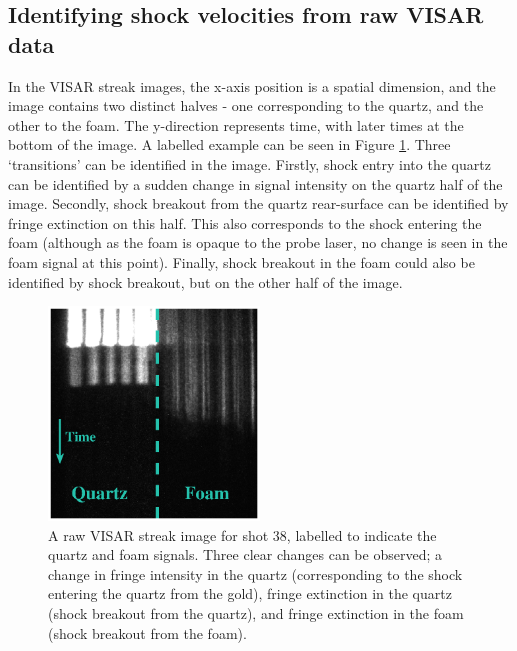\subsection{Identifying shock velocities from raw VISAR data}

In the VISAR streak images, the x-axis position is a spatial dimension, and the image contains two distinct halves - one corresponding to the quartz, and the other to the foam. The y-direction represents time, with later times at the bottom of the image. A labelled example can be seen in Figure \ref{fig:VISARImage}. Three `transitions' can be identified in the image. Firstly, shock entry into the quartz can be identified by a sudden change in signal intensity on the quartz half of the image. Secondly, shock breakout from the quartz rear-surface can be identified by fringe extinction on this half. This also corresponds to the shock entering the foam (although as the foam is opaque to the probe laser, no change is seen in the foam signal at this point). Finally, shock breakout in the foam could also be identified by shock breakout, but on the other half of the image.

\begin{figure} [h]
\begin{centering}
\includegraphics[width=0.5\textwidth]{figures/Experiment/VISARImage.eps}%
\caption{\label{fig:VISARImage} A raw VISAR streak image for shot 38, labelled to indicate the quartz and foam signals. Three clear changes can be observed; a change in fringe intensity in the quartz (corresponding to the shock entering the quartz from the gold), fringe extinction in the quartz (shock breakout from the quartz), and fringe extinction in the foam (shock breakout from the foam). }
\end{centering}
\end{figure}


